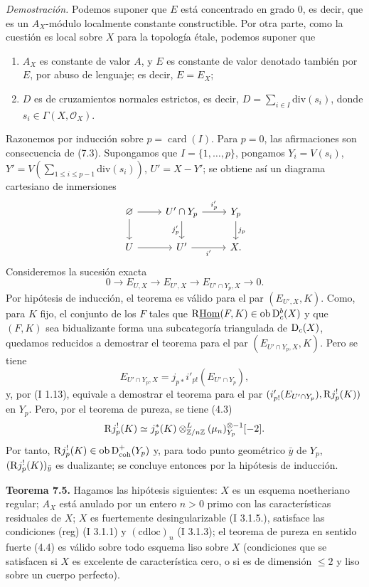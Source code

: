\emph{Demostración.} Podemos suponer que $E$ está concentrado en grado $0$, es decir, que es un $A_X$-módulo localmente constante constructible. Por otra parte, como la cuestión es local sobre $X$ para la topología étale, podemos suponer que
\begin{enumerate}[label=(\alph*)]
\item $A_X$ es constante de valor $A$, y $E$ es constante de valor denotado también por $E$, por abuso de lenguaje; es decir, $E=E_X$;
\item $D$ es de cruzamientos normales estrictos, es decir, $D=\sum_{i\in I}\mathrm{div}(s_i)$, donde $s_i\in\Gamma(X,\mathcal{O}_X)$.
\end{enumerate}
Razonemos por inducción sobre $p=\operatorname{card}(I)$. Para $p=0$, las afirmaciones son consecuencia de (7.3). Supongamos que $I=\{1,\ldots,p\}$, pongamos $Y_i=V(s_i)$, $Y'=V(\sum_{1\leq i\leq p-1}\mathrm{div}(s_i))$, $U'=X-Y'$; se obtiene así un diagrama cartesiano de inmersiones
\[
\begin{tikzcd}
\varnothing \arrow[r] \arrow[d] & U'\cap Y_p \arrow[r,"i'_p"] \arrow[d,"j'_p"'] & Y_p \arrow[d,"j_p"]\\
U \arrow[r] & U' \arrow[r,"i'"'] & X.
\end{tikzcd}
\]
Consideremos la sucesión exacta
\[
        0\longrightarrow E_{U,X}\longrightarrow E_{U',X}\longrightarrow E_{U'\cap Y_p,X}\longrightarrow0.
\]
Por hipótesis de inducción, el teorema es válido para el par $(E_{U',X},K)$. Como, para $K$ fijo, el conjunto de los $F$ tales que $\mathrm{R}\underline{\operatorname{Hom}}(F,K)\in\operatorname{ob}\mathrm{D}_c^b(X)$ y que $(F,K)$ sea bidualizante forma una subcategoría triangulada de $\mathrm{D}_c(X)$, quedamos reducidos a demostrar el teorema para el par $(E_{U'\cap Y_p,X},K)$. Pero se tiene
\[
        E_{U'\cap Y_p,X}=j_{p*}i'_{p!}(E_{U'\cap Y_p}),
\]
y, por (I 1.13), equivale a demostrar el teorema para el par $(i'_{p!}(E_{U'\cap Y_p}),\mathrm{R} j_p^!(K))$ en $Y_p$. Pero, por el teorema de pureza, se tiene (4.3)
\[
        \mathrm{R} j_p^!(K)\simeq j_p^*(K)\otimes^L_{\mathbb{Z}/n\mathbb{Z}}(\mu_n)_{Y_p}^{\otimes -1}[-2].
\]
Por tanto, $\mathrm{R} j_p^!(K)\in\operatorname{ob}\mathrm{D}^{+}_{\mathrm{coh}}(Y_p)$ y, para todo punto geométrico $\bar{y}$ de $Y_p$, $(\mathrm{R} j_p^!(K))_{\bar{y}}$ es dualizante; se concluye entonces por la hipótesis de inducción.

\textbf{Teorema 7.5.} Hagamos las hipótesis siguientes: $X$ es un esquema noetheriano regular; $A_X$ está anulado por un entero $n>0$ primo con las características residuales de $X$; $X$ es fuertemente desingularizable (I 3.1.5.), satisface las condiciones (reg) (I 3.1.1) y $(\mathrm{cdloc})_n$ (I 3.1.3); el teorema de pureza en sentido fuerte (4.4) es válido sobre todo esquema liso sobre $X$ (condiciones que se satisfacen si $X$ es excelente de característica cero, o si es de dimensión $\leq2$ y liso sobre un cuerpo perfecto).

